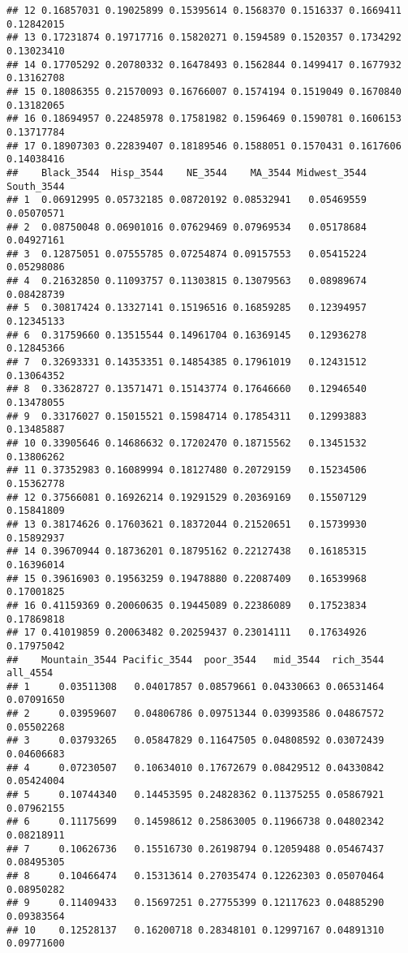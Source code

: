 \documentclass[
]{article}
\begin{document}
\begin{verbatim}
## 12 0.16857031 0.19025899 0.15395614 0.1568370 0.1516337 0.1669411 0.12842015
## 13 0.17231874 0.19717716 0.15820271 0.1594589 0.1520357 0.1734292 0.13023410
## 14 0.17705292 0.20780332 0.16478493 0.1562844 0.1499417 0.1677932 0.13162708
## 15 0.18086355 0.21570093 0.16766007 0.1574194 0.1519049 0.1670840 0.13182065
## 16 0.18694957 0.22485978 0.17581982 0.1596469 0.1590781 0.1606153 0.13717784
## 17 0.18907303 0.22839407 0.18189546 0.1588051 0.1570431 0.1617606 0.14038416
##    Black_3544  Hisp_3544    NE_3544    MA_3544 Midwest_3544 South_3544
## 1  0.06912995 0.05732185 0.08720192 0.08532941   0.05469559 0.05070571
## 2  0.08750048 0.06901016 0.07629469 0.07969534   0.05178684 0.04927161
## 3  0.12875051 0.07555785 0.07254874 0.09157553   0.05415224 0.05298086
## 4  0.21632850 0.11093757 0.11303815 0.13079563   0.08989674 0.08428739
## 5  0.30817424 0.13327141 0.15196516 0.16859285   0.12394957 0.12345133
## 6  0.31759660 0.13515544 0.14961704 0.16369145   0.12936278 0.12845366
## 7  0.32693331 0.14353351 0.14854385 0.17961019   0.12431512 0.13064352
## 8  0.33628727 0.13571471 0.15143774 0.17646660   0.12946540 0.13478055
## 9  0.33176027 0.15015521 0.15984714 0.17854311   0.12993883 0.13485887
## 10 0.33905646 0.14686632 0.17202470 0.18715562   0.13451532 0.13806262
## 11 0.37352983 0.16089994 0.18127480 0.20729159   0.15234506 0.15362778
## 12 0.37566081 0.16926214 0.19291529 0.20369169   0.15507129 0.15841809
## 13 0.38174626 0.17603621 0.18372044 0.21520651   0.15739930 0.15892937
## 14 0.39670944 0.18736201 0.18795162 0.22127438   0.16185315 0.16396014
## 15 0.39616903 0.19563259 0.19478880 0.22087409   0.16539968 0.17001825
## 16 0.41159369 0.20060635 0.19445089 0.22386089   0.17523834 0.17869818
## 17 0.41019859 0.20063482 0.20259437 0.23014111   0.17634926 0.17975042
##    Mountain_3544 Pacific_3544  poor_3544   mid_3544  rich_3544   all_4554
## 1     0.03511308   0.04017857 0.08579661 0.04330663 0.06531464 0.07091650
## 2     0.03959607   0.04806786 0.09751344 0.03993586 0.04867572 0.05502268
## 3     0.03793265   0.05847829 0.11647505 0.04808592 0.03072439 0.04606683
## 4     0.07230507   0.10634010 0.17672679 0.08429512 0.04330842 0.05424004
## 5     0.10744340   0.14453595 0.24828362 0.11375255 0.05867921 0.07962155
## 6     0.11175699   0.14598612 0.25863005 0.11966738 0.04802342 0.08218911
## 7     0.10626736   0.15516730 0.26198794 0.12059488 0.05467437 0.08495305
## 8     0.10466474   0.15313614 0.27035474 0.12262303 0.05070464 0.08950282
## 9     0.11409433   0.15697251 0.27755399 0.12117623 0.04885290 0.09383564
## 10    0.12528137   0.16200718 0.28348101 0.12997167 0.04891310 0.09771600

\end{verbatim}
\end{document}
